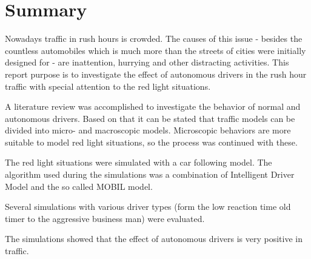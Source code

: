 \chapter*{Summary}
Nowadays traffic in rush hours is crowded. The causes of this issue - besides the countless automobiles which is much more than the streets of cities were initially designed for - are inattention, hurrying and other distracting activities. This report purpose is to investigate the effect of autonomous drivers in the rush hour traffic with special attention to the red light situations.

A literature review was accomplished to investigate the behavior of normal and autonomous drivers. Based on that it can be stated that traffic models can be divided into micro- and macroscopic models. Microscopic behaviors are more suitable to model red light situations, so the process was continued with these.

The red light situations were simulated with a car following model. The algorithm used during the simulations was a combination of Intelligent Driver Model and the so called MOBIL model.

Several simulations with various driver types (form the low reaction time old timer to the aggressive business man) were evaluated.

The simulations showed that the effect of autonomous drivers is very positive in traffic.
